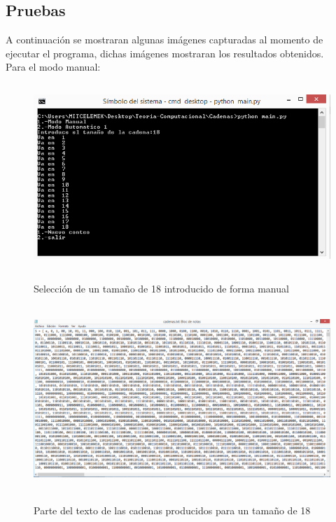 \documentclass[12pt,letterpaper]{article}
\begin{document}
\subsection{Pruebas}
A continuaci\'on se mostraran algunas im\'agenes capturadas al momento de ejecutar el programa, dichas im\'agenes mostraran los resultados obtenidos.\\
\vspace{1.0cm}
Para el modo manual:\\
\begin{figure}[H]
\includegraphics[width=\textwidth, height=7cm]{modomanualinicio.png}
\label{fig:manual_alfabeto}
\caption{Selecci\'on de un tama\~no de 18 introducido de forma manual}
\end{figure}

\begin{figure}[H]
\includegraphics[width=\textwidth, height=7cm]{textomodomanual.png}
\label{fig:manualtexto_alfabeto}
\caption{Parte del texto de las cadenas producidos para un tama\~no de 18}
\end{figure}
\end{document}
